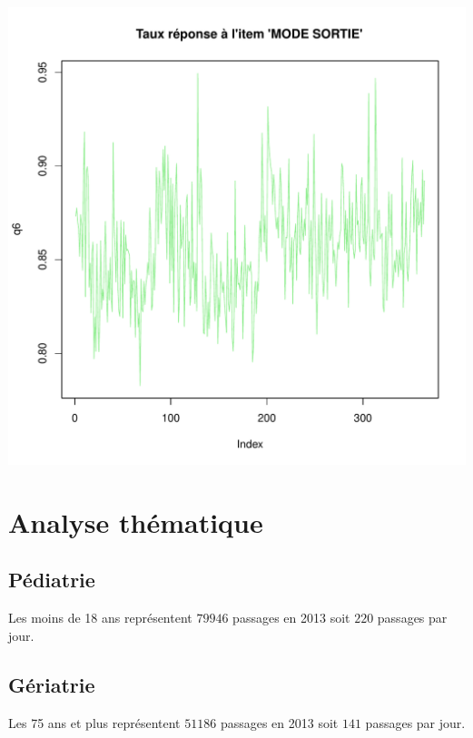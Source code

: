 \documentclass[12pt,english,french,twoside]{report}\usepackage[]{graphicx}\usepackage[]{color}
\makeatletter
\def\maxwidth{ %
  \ifdim\Gin@nat@width>\linewidth
    \linewidth
  \else
    \Gin@nat@width
  \fi
}
\makeatother
\begin{document}
\includegraphics[width=\maxwidth]{figure/retour_dom3} 




\part{Analyse thématique} 
\newpage

\chapter{Pédiatrie}





Les moins de 18 ans représentent $79946$ passages en 2013 soit $220$ passages par jour.

\chapter{Gériatrie}






Les 75 ans et plus représentent $51186$ passages en 2013 soit $141$ passages par jour.
\end{document}
